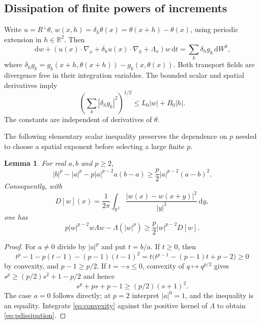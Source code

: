 \documentclass[11pt]{amsart}
\newtheorem{lemma}[theorem]{Lemma}
\theoremstyle{remark}
\numberwithin{equation}{section}
\newcommand{\R}{\mathbb R}
\newcommand{\dd}{\,\mathrm d}
\begin{document}
\subsection{Dissipation of finite powers of increments}

Write $u=R^\perp\theta$, $w(x,h)=\delta_h\theta(x)=\theta(x+h)-\theta(x)$,
using periodic extension in $h\in\R^2$. Then
\begin{equation}\label{eq:increment}
 \dd w+(u(x)\cdot\nabla_x+\delta_hu(x)\cdot\nabla_h+\Lambda_x)w\dd t
       =\sum_k\delta_hg_k\dd W^k,
\end{equation}
where $\delta_hg_k=g_k(x+h,\theta(x+h))-g_k(x,\theta(x))$.
Both transport fields are divergence free in their integration variables.
The bounded scalar and spatial derivatives imply
\begin{equation}\label{eq:noiseincrement}
 \left(\sum_k|\delta_hg_k|^2\right)^{1/2}\leq L_0|w|+B_0|h|.
\end{equation}
The constants are independent of derivatives of $\theta$.

The following elementary scalar inequality preserves the dependence on $p$
needed to choose a spatial exponent before selecting a large finite $p$.

\begin{lemma}\label{lem:convexity}
For real $a,b$ and $p\geq2$,
\begin{equation}\label{eq:convexity}
 |b|^p-|a|^p-p|a|^{p-2}a(b-a)
       \geq\frac p2|a|^{p-2}(a-b)^2.
\end{equation}
Consequently, with
\[
 D[w](x)=\frac1{2\pi}\int_{\R^2}
           \frac{|w(x)-w(x+y)|^2}{|y|^3}\dd y,
\]
one has
\begin{equation}\label{eq:pdissipation}
 p|w|^{p-2}w\Lambda w-\Lambda(|w|^p)
       \geq\frac p2|w|^{p-2}D[w].
\end{equation}
\end{lemma}

\begin{proof}
For $a\ne0$ divide by $|a|^p$ and put $t=b/a$. If $t\geq0$, then
\[
 t^p-1-p(t-1)-(p-1)(t-1)^2
 =t\big(t^{p-1}-(p-1)t+p-2\big)\geq0
\]
by convexity, and $p-1\geq p/2$. If $t=-s\leq0$, convexity of
$q\mapsto q^{p/2}$ gives $s^p\geq(p/2)s^2+1-p/2$ and hence
\[
 s^p+ps+p-1\geq(p/2)(s+1)^2.
\]
The case $a=0$ follows directly; at $p=2$ interpret $|a|^0=1$,
and the inequality is an equality.
Integrate \eqref{eq:convexity} against the positive kernel of $\Lambda$ to
obtain \eqref{eq:pdissipation}.
\end{proof}
\end{document}
